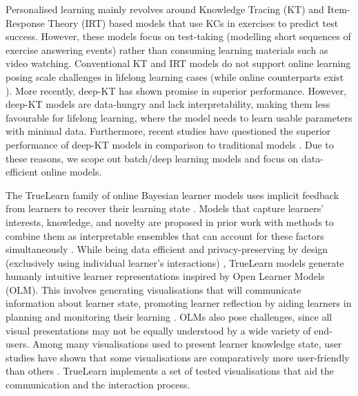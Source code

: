 \documentclass[letterpaper]{article} %
\begin{document}
Personalised learning mainly revolves around Knowledge Tracing (KT) \cite{psych5030050} and Item-Response Theory (IRT) \cite{Rasch1960} based models that use KCs in exercises to predict test success. However, these models focus on test-taking (modelling short sequences of exercise answering events) rather than consuming learning materials such as video watching. Conventional KT and IRT models do not support online learning posing scale challenges in lifelong learning cases (while online counterparts exist \cite{bishopsnewbook}). More recently, deep-KT \cite{deep_kt} has shown promise in superior performance. However, deep-KT models are data-hungry and lack interpretability, making them less favourable for lifelong learning, where the model needs to learn usable parameters with minimal data. Furthermore, recent studies have questioned the superior performance of deep-KT models in comparison to traditional models \cite{Schmucker_Wang_Hu_Mitchell_2022}. Due to these reasons, we scope out batch/deep learning models and focus on data-efficient online models.

The TrueLearn family of online Bayesian learner models uses implicit feedback from learners to recover their learning state \cite{truelearn}. Models that capture learners' interests, knowledge, and novelty are proposed in prior work with methods to combine them as interpretable ensembles that can account for these factors simultaneously \cite{bulathwela2022sus}.
While being data efficient and privacy-preserving by design
(exclusively using individual learner's interactions)
,
TrueLearn models generate humanly intuitive learner representations inspired by Open Learner Models (OLM).
This involves generating visualisations that will communicate information about learner state, promoting learner reflection by aiding learners in planning and monitoring their learning \cite{openlearnermodels}.
OLMs also pose challenges, since all visual presentations may not be equally understood by a wide variety of end-users. Among many visualisations used to present learner knowledge state, user studies have shown that some visualisations are comparatively more user-friendly than others \cite{10.1007/978-3-319-98572-5_40,visualisationscomparison}. TrueLearn implements a set of tested visualisations that aid the communication and the interaction process.
\end{document}
